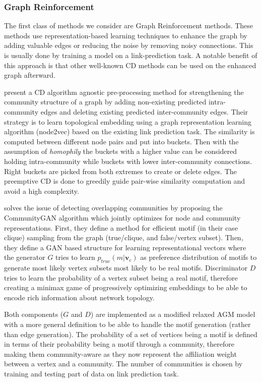 \documentclass[
acmsmall,
nonacm,
screen,
acmthm]{acmart}
\begin{document}
\hypertarget{graph-reinforcement}{%
\subsubsection{Graph Reinforcement}\label{graph-reinforcement}}

The first class of methods we consider are Graph Reinforcement methods.
These methods use representation-based learning techniques to enhance
the graph by adding valuable edges or reducing the noise by removing
noisy connections. This is usually done by training a model on a
link-prediction task. A notable benefit of this approach is that other
well-known CD methods can be used on the enhanced graph afterward.

\citet{kangCommunityReinforcementEffective2021} present a CD algorithm
agnostic pre-processing method for strengthening the community structure
of a graph by adding non-existing predicted intra-community edges and
deleting existing predicted inter-community edges. Their strategy is to
learn topological embedding using a graph representation learning
algorithm (node2vec) based on the existing link prediction task. The
similarity is computed between different node pairs and put into
buckets. Then with the assumption of \emph{homophily} the buckets with a
higher value can be considered holding intra-community while buckets
with lower inter-community connections. Right buckets are picked from
both extremes to create or delete edges. The preemptive CD is done to
greedily guide pair-wise similarity computation and avoid a high
complexity.

\citet{jiaCommunityGANCommunityDetection2019} solves the issue of
detecting overlapping communities by proposing the CommunityGAN
algorithm which jointly optimizes for node and community
representations. First, they define a method for efficient motif (in
their case clique) sampling from the graph (true/clique, and
false/vertex subset). Then, they define a GAN based structure for
learning representational vectors where the generator \(G\) tries to
learn \(p_{true}(m|\mathbf{v}_c)\) as preference distribution of motifs
to generate most likely vertex subsets most likely to be real motifs.
Discriminator \(D\) tries to learn the probability of a vertex subset
being a real motif, therefore creating a minimax game of progressively
optimizing embeddings to be able to encode rich information about
network topology.

Both components (\(G\) and \(D\)) are implemented as a modified relaxed
AGM model with a more general definition to be able to handle the motif
generation (rather than edge generation). The probability of a set of
vertices being a motif is defined in terms of their probability being a
motif through a community, therefore making them community-aware as they
now represent the affiliation weight between a vertex and a community.
The number of communities is chosen by training and testing part of data
on link prediction task.
\end{document}
